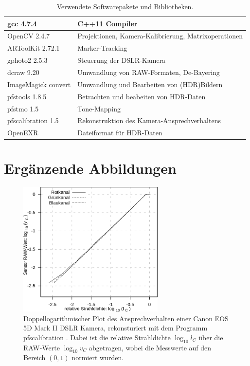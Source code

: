   \begin{table}[H]
   \begin{tabular}{|l|l|}  
   \hline
     gcc 4.7.4 \cite{gcc}		& C++11 Compiler \\
   \hline
     OpenCV 2.4.7 \cite{opencv}		& Projektionen, Kamera-Kalibrierung, Matrixoperationen \\
   \hline
     ARToolKit 2.72.1 \cite{artoolkit}	& Marker-Tracking \\
   \hline
     gphoto2 2.5.3 \cite{gphoto2} 	& Steuerung der DSLR-Kamera \\ 
   \hline
     dcraw 9.20 \cite{dcraw} 		& Umwandlung von RAW-Formaten, De-Bayering \\ 
   \hline
     ImageMagick convert \cite{convert} &Umwandlung und Bearbeiten von (HDR)Bildern \\
   \hline
     pfstools 1.8.5 \cite{pfstools}		& Betrachten und beabeiten von HDR-Daten \\
   \hline
     pfstmo 1.5 \cite{pfstmo}		& Tone-Mapping \\
   \hline
     pfscalibration 1.5 \cite{pfscalibration}   & Rekonstruktion des Kamera-Ansprechverhaltens \\
   \hline
     OpenEXR \cite{openexr}		& Dateiformat für HDR-Daten \\
   \hline
  \end{tabular} 
  \caption[Verwendete Softwarepakete und Bibliotheken]{Verwendete Softwarepakete und Bibliotheken. }
  \label{tab:software}
 \end{table}

\section{Ergänzende Abbildungen} 
 
  \begin{figure}[H]
    \centering
    \includegraphics[width=0.65\textwidth]{../graphics/kalibrierung/canon_response_log-log.svg}
    \caption[Ansprechverhalten der DSLR im Log-Log Plot]{Doppellogarithmischer Plot des Ansprechverhalten einer Canon EOS 5D Mark II DSLR Kamera, rekonsturiert mit dem Programm pfscalibration \cite{pfscalibration}.  
    Dabei ist die relative Strahldichte $\log_{10}l_C$ über die RAW-Werte $\log_{10}v_C$ abgetragen, wobei die Messwerte auf den Bereich $(0,1)$ normiert wurden.
 }
    \label{fig:canon_response_loglog}
   \end{figure}

